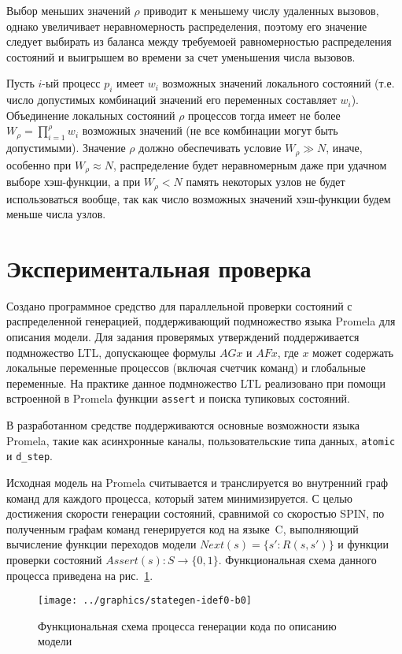 \documentclass[12pt,a4paper,fleqn]{article}
\begin{document}
Выбор меньших значений $\rho$ приводит к меньшему числу удаленных вызовов, однако увеличивает неравномерность
распределения, поэтому его значение следует выбирать из баланса между требуемоей равномерностью распределения состояний
и выигрышем во времени за счет уменьшения числа вызовов.

Пусть $i$-ый процесс $p_i$ имеет $w_i$ возможных значений локального состояний (т.е. число допустимых комбинаций
значений его переменных составляет $w_i$). Объединение локальных состояний $\rho$ процессов тогда имеет не более $W_\rho
= \prod_{i=1}^{\rho}{w_i}$ возможных значений (не все комбинации могут быть допустимыми). Значение $\rho$ должно
обеспечивать условие $W_\rho \gg N$, иначе, особенно при $W_\rho \approx N$, распределение будет неравномерным даже при
удачном выборе хэш-функции, а при $W_\rho < N$ память некоторых узлов не будет использоваться вообще, так как число
возможных значений хэш-функции будем меньше числа узлов.

\section{Экспериментальная проверка}
\label{sec:experim}

Создано программное средство для параллельной проверки состояний с распределенной генерацией, поддерживающий подмножество языка
Promela для описания модели. Для задания проверямых утверждений поддерживается подмножество LTL, допускающее формулы $AG
x$ и $AF x$, где $x$ может содержать локальные переменные процессов (включая счетчик команд) и глобальные переменные. На
практике данное подмножество LTL реализовано при помощи встроенной в Promela функции \texttt{assert} и поиска тупиковых
состояний.

В разработанном средстве поддерживаются основные возможности языка Promela, такие как асинхронные каналы,
пользовательские типа данных, \texttt{atomic} и \texttt{d\_step}.~\cite{SpinRoot}

Исходная модель на Promela считывается и транслируется во внутренний граф команд для каждого процесса, который затем
минимизируется. С целью достижения скорости генерации состояний, сравнимой со скоростью SPIN, по полученным графам
команд генерируется код на языке~C, выполняющий вычисление функции переходов модели $Next(s) = \{s': R(s, s')\}$ и
функции проверки состояний $Assert(s): S \rightarrow \{0, 1\}$. Функциональная схема данного процесса приведена на
рис.~\ref{fig:stategen-idef0-b0}.

\begin{figure}[ht]
  \centering
  \texttt{[image: ../graphics/stategen-idef0-b0]}
  \caption{Функциональная схема процесса генерации кода по описанию модели}
  \label{fig:stategen-idef0-b0}
\end{figure}
\end{document}
